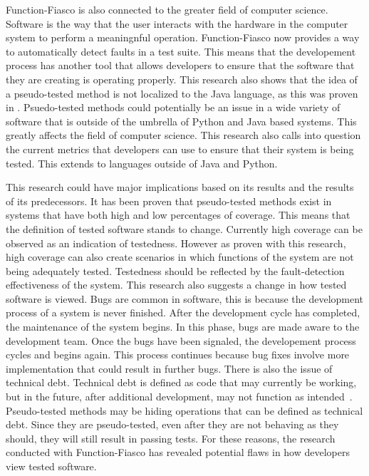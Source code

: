 Function-Fiasco is also connected to the greater field of computer science. Software is the way that the user interacts with the hardware in the computer system to perform a meaningnful operation. Function-Fiasco now provides a way to automatically detect faults in a test suite. This means that the developement process has another tool that allows developers to ensure that the software that they are creating is operating properly. This research also shows that the idea of a pseudo-tested method is not localized to the Java language, as this was proven in \cite{niedermayr2016will}. Psuedo-tested methods could potentially be an issue in a wide variety of software that is outside of the umbrella of Python and Java based systems. This greatly affects the field of computer science. This research also calls into question the current metrics that developers can use to ensure that their system is being tested. This extends to languages outside of Java and Python.

This research could have major implications based on its results and the results of its predecessors. It has been proven that pseudo-tested methods exist in systems that have both high and low percentages of coverage.
  This means that the definition of tested software stands to change. Currently high coverage can be observed as an indication of testedness. However as proven with this research, high coverage can also create scenarios in which functions of the system are not being adequately tested. Testedness should be reflected by the fault-detection effectiveness of the system. This research also suggests a change in how tested software is viewed. Bugs are common in software, this is because the development process of a system is never finished. After the development cycle has completed, the maintenance of the system begins. In this phase, bugs are made aware to the development team. Once the bugs have been signaled, the developement process cycles and begins again. This process continues because bug fixes involve more implementation that could result in further bugs. There is also the issue of technical debt. Technical debt is defined as code that may currently be working, but in the future, after additional development, may not function as intended~\cite{verdecchia2018architectural}. Pseudo-tested methods may be hiding operations that can be defined as technical debt. Since they are pseudo-tested, even after they are not behaving as they should, they will still result in passing tests. For these reasons, the research conducted with Function-Fiasco has revealed potential flaws in how developers view tested software.

